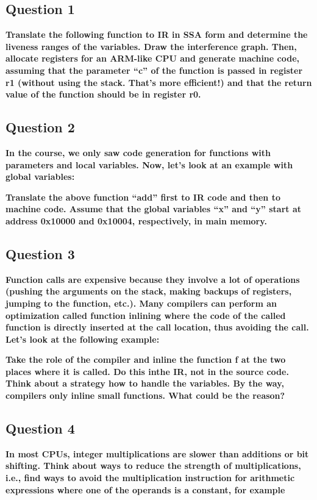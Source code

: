 \subsection{Question 1}
    \textbf{Translate the following function to IR in SSA form and determine the liveness ranges of the variables. Draw the interference graph. Then, allocate registers for an ARM-like CPU and generate machine
code, assuming that the parameter “c” of the function is passed in register r1 (without using the stack. That’s more efficient!) and that the return value of the function should be in register r0.}

    

    

    

\subsection{Question 2}
    \textbf{In the course, we only saw code generation for functions with parameters and local variables. Now,
let’s look at an example with global variables:}

    

    \textbf{Translate the above function “add” first to IR code and then to machine code. Assume that the global
variables “x” and “y” start at address 0x10000 and 0x10004, respectively, in main memory.}
    

\subsection{Question 3}
    \textbf{Function calls are expensive because they involve a lot of operations (pushing the arguments on the stack, making backups of registers, jumping to the function, etc.). Many compilers can perform an optimization called function inlining where the code of the called function is directly inserted at the call location, thus avoiding the call. Let’s look at the following example:}

    

    \textbf{Take the role of the compiler and inline the function f at the two places where it is called. Do this inthe IR, not in the source code. Think about a strategy how to handle the variables. By the way, compilers only inline small functions. What could be the reason?}

    

\subsection{Question 4}
    \textbf{In most CPUs, integer multiplications are slower than additions or bit shifting. Think about ways to reduce the strength of multiplications, i.e., find ways to avoid the multiplication instruction for arithmetic expressions where one of the operands is a constant, for example }

    

    